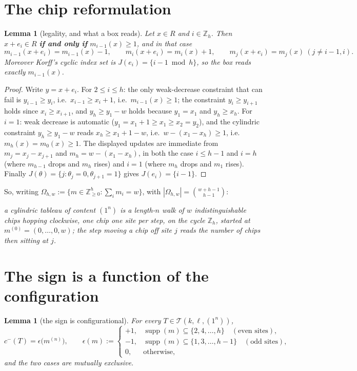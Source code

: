 \documentclass[11pt]{article}
\theoremstyle{plain}
\newtheorem{lemma}[theorem]{Lemma}
\theoremstyle{definition}
\theoremstyle{remark}
\newcommand{\Zh}{\mathbb{Z}_h}
\newcommand{\cm}{c^{-}}
\newcommand{\supp}{\operatorname{supp}}
\begin{document}
\section{The chip reformulation}

\begin{lemma}[legality, and what a box reads]\label{lem:chip}
Let $x\in R$ and $i\in\Zh$. Then $x+e_i\in R$ \textbf{if and only if} $m_{i-1}(x)\ge1$, and in
that case
\[
m_{i-1}(x+e_i)=m_{i-1}(x)-1,\qquad m_{i}(x+e_i)=m_{i}(x)+1,\qquad m_j(x+e_i)=m_j(x)\ (j\ne i-1,i).
\]
Moreover Korff's cyclic index set is $J(e_i)=\{i-1\bmod h\}$, so the box reads exactly
$m_{i-1}(x)$.
\end{lemma}

\begin{proof}
Write $y=x+e_i$. For $2\le i\le h$: the only weak-decrease constraint that can fail is
$y_{i-1}\ge y_i$, i.e.\ $x_{i-1}\ge x_i+1$, i.e.\ $m_{i-1}(x)\ge1$; the constraint
$y_i\ge y_{i+1}$ holds since $x_i\ge x_{i+1}$, and $y_h\ge y_1-w$ holds because $y_1=x_1$ and
$y_h\ge x_h$. For $i=1$: weak decrease is automatic ($y_1=x_1+1\ge x_1\ge x_2=y_2$), and the
cylindric constraint $y_h\ge y_1-w$ reads $x_h\ge x_1+1-w$, i.e.\ $w-(x_1-x_h)\ge1$, i.e.\
$m_h(x)=m_{0}(x)\ge1$. The displayed updates are immediate from
$m_j=x_j-x_{j+1}$ and $m_h=w-(x_1-x_h)$, in both the case $i\le h-1$ and $i=h$ (where
$m_{h-1}$ drops and $m_h$ rises) and $i=1$ (where $m_h$ drops and $m_1$ rises). Finally
$J(\theta)=\{j:\theta_j=0,\theta_{j+1}=1\}$ gives $J(e_i)=\{i-1\}$.
\end{proof}

\noindent So, writing $\Omega_{h,w}:=\{m\in\mathbb{Z}_{\ge0}^h:\sum_i m_i=w\}$, with
$|\Omega_{h,w}|=\binom{w+h-1}{h-1}$:

\begin{center}\itshape
a cylindric tableau of content $(1^n)$ is a length-$n$ walk of $w$ indistinguishable chips
hopping clockwise, one chip one site per step, on the cycle $\Zh$, started at
$m^{(0)}=(0,\dots,0,w)$; the step moving a chip off site $j$ reads the number of chips then
sitting at $j$.
\end{center}

\section{The sign is a function of the configuration}

\begin{lemma}[the sign is configurational]\label{lem:sign}
For every $T\in\mathcal T(k,\ell,(1^n))$,
\[
\cm(T)=\epsilon\bigl(m^{(n)}\bigr),\qquad
\epsilon(m):=\begin{cases}
+1,&\supp(m)\subseteq\{2,4,\dots,h\}\quad(\text{even sites}),\\
-1,&\supp(m)\subseteq\{1,3,\dots,h-1\}\quad(\text{odd sites}),\\
0,&\text{otherwise,}
\end{cases}
\]
and the two cases are mutually exclusive.
\end{lemma}
\end{document}

